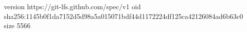 version https://git-lfs.github.com/spec/v1
oid sha256:1145b0f1da7152d5d98a5a015071bdf44d1172224df125ca42126084ad6b63c0
size 5566
